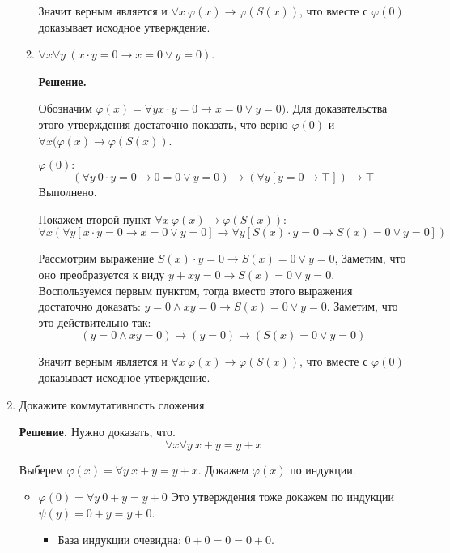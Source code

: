 \begin{enumerate}
\begin{enumerate}
Значит верным является и $\forall x \ \varphi(x) \to \varphi(S(x))$, что вместе с $\varphi(0)$ доказывает 
исходное утверждение.

\item $\forall x \forall y\ (x \cdot y = 0 \to x = 0 \lor y = 0)$.

\textbf{Решение.} 

Обозначим $\varphi(x) = \forall y x \cdot y = 0 \to x = 0 \lor y = 0)$. Для доказательства этого утверждения 
достаточно показать, что верно $\varphi(0)$ и $\forall x (\varphi(x) \to \varphi(S(x))$.

$\varphi(0):$ 
\begin{equation*}
(\forall y \ 0 \cdot y = 0 \to 0 = 0 \lor y = 0) \to (\forall y [y = 0 \to \top]) \to \top 
\end{equation*}
Выполнено.

Покажем второй пункт  $\forall x \ \varphi(x) \to \varphi(S(x))$:
\begin{equation*}
\forall x (\forall y [x \cdot y = 0 \to x = 0 \lor y = 0] \to \forall y [S(x) \cdot y = 0 \to S(x) = 0 \lor y = 0])
\end{equation*}

Рассмотрим выражение $S(x) \cdot y = 0 \to S(x) = 0 \lor y = 0$, Заметим, что оно преобразуется к виду $y + xy = 0 \to S(x) = 0 \lor y = 0$. Воспользуемся первым пунктом, тогда вместо этого выражения достаточно доказать: $y = 0 \land xy = 0 \to S(x) = 0 \lor y = 0$. Заметим, что это действительно так: 
\begin{equation*}
(y = 0 \land xy = 0) \to (y = 0) \to (S(x) = 0 \lor y = 0)
\end{equation*}

Значит верным является и $\forall x \ \varphi(x) \to \varphi(S(x))$, что вместе с $\varphi(0)$ доказывает 
исходное утверждение.
\end{enumerate}

\item Докажите коммутативность сложения.

\textbf{Решение.} Нужно доказать, что.
\begin{equation*}
\forall x \forall y \ x + y = y + x
\end{equation*}

Выберем $\varphi(x) = \forall y \ x + y = y + x$. Докажем $\varphi(x)$ по индукции.

\begin{itemize}
	\item $\varphi(0) = \forall y \ 0 + y = y + 0$ Это утверждения тоже докажем по индукции $\psi(y) = 0 + y = y 
	+ 0$.
	\begin{itemize}
		\item База индукции очевидна: $0 + 0 = 0 = 0 + 0$.
		

\end{itemize}
\end{itemize}
\end{enumerate}

